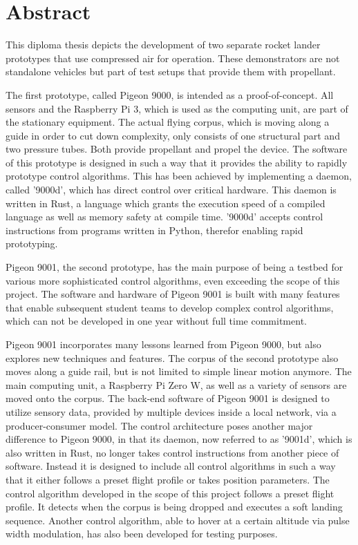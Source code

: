 \chapter{Abstract}

This diploma thesis depicts the development of two separate rocket lander prototypes that use compressed air for operation. These demonstrators are not standalone vehicles but part of test setups that provide them with propellant. 

The first prototype, called Pigeon 9000, is intended as a proof-of-concept. All sensors and the Raspberry Pi 3, which is used as the computing unit, are part of the stationary equipment. The actual flying corpus, which is moving along a guide in order to cut down complexity, only consists of one structural part and two pressure tubes. Both provide propellant and propel the device. The software of this prototype is designed in such a way that it provides the ability to rapidly prototype control algorithms. This has been achieved by implementing a daemon, called '9000d', which has direct control over critical hardware. This daemon is written in Rust, a language which grants the execution speed of a compiled language as well as memory safety at compile time. '9000d' accepts control instructions from programs written in Python, therefor enabling rapid prototyping.

Pigeon 9001, the second prototype, has the main purpose of being a testbed for various more sophisticated control algorithms, even exceeding the scope of this project. The software and hardware of Pigeon 9001 is built with many features that enable subsequent student teams to develop complex control algorithms, which can not be developed in one year without full time commitment.

Pigeon 9001 incorporates many lessons learned from Pigeon 9000, but also explores new techniques and features. The corpus of the second prototype also moves along a guide rail, but is not limited to simple linear motion anymore. The main computing unit, a Raspberry Pi Zero W, as well as a variety of sensors are moved onto the corpus. The back-end software of Pigeon 9001 is designed to utilize sensory data, provided by multiple devices inside a local network, via a producer-consumer model. The control architecture poses another major difference to Pigeon 9000, in that its daemon, now referred to as '9001d', which is also written in Rust, no longer takes control instructions from another piece of software. Instead it is designed to include all control algorithms in such a way that it either follows a preset flight profile or takes position parameters. The control algorithm developed in the scope of this project follows a preset flight profile. It detects when the corpus is being dropped and executes a soft landing sequence. Another control algorithm, able to hover at a certain altitude via pulse width modulation, has also been developed for testing purposes.